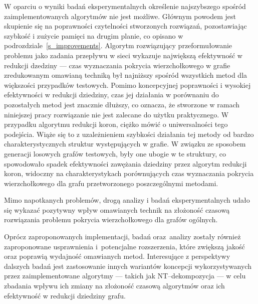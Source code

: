  W oparciu o wyniki badań eksperymentalnych określenie najszybszego spośród zaimplementowanych algorytmów nie jest możliwe.
  Głównym powodem jest skupienie się na poprawności czytelności stworzonych rozwiązań, pozostawiając szybkość i zużycie pamięci na drugim planie, co opisano w podrozdziale~\ref{s_improvements}.
  Algorytm rozwiązujący przeformułowanie problemu jako zadania przepływu w sieci wykazuje największą efektywność w redukcji dzedziny --- czas wyznaczania pokrycia wierzchołkowego w grafie zredukowanym omawianą techniką był najniższy spośród wszystkich metod dla większości przypadków testowych.
  Pomimo koncepcyjnej poprawności i wysokiej efektywności w redukcji dziedziny, czas jej działania w porównaniu do pozostałych metod jest znacznie dłuższy, co oznacza, że stworzone w ramach niniejszej pracy rozwiązanie nie jest zalecane do użytku praktycznego.
  W przypadku algorytmu redukcji koron, ciężko mówić o uniwersalności tego podejścia.
  Wiąże się to z uzależnieniem szybkości działania tej metody od bardzo charakterystycznych struktur występujących w grafie.
  W związku ze sposobem generacji losowych grafów testowych, były one ubogie w te struktury, co spowodowało spadek efektywności zawężania dziedziny przez algorytm redukcji koron, widoczny na charakterystykach porównujących czas wyznaczania pokrycia wierzchołkowego dla grafu przetworzonego poszczególnymi metodami.

  Mimo napotkanych problemów, drogą analizy i badań eksperymentalnych udało się wykazać pozytywny wpływ omawianych technik na złożoność czasową rozwiązania problemu pokrycia wierzchołkowego dla grafów ogólnych.

  Oprócz zaproponowanych implementacji, badań oraz~analizy zostały również zaproponowane usprawnienia i~potencjalne rozszerzenia, które zwiększą jakość oraz poprawią wydajność omawianych metod.
  Interesujące z perspektywy dalszych badań jest zastosowanie innych wariantów koncepcji wykorzystywanych przez zaimplementowane algorytmy --- takich jak NT--dekompozycja --- w celu zbadania wpływu ich zmiany na złożoność czasową algorytmów oraz ich efektywność w redukcji dziedziny grafu.